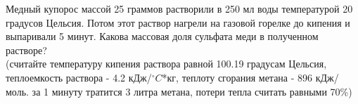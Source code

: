 Медный купорос массой 25 граммов растворили в 250 мл воды температурой 20 градусов Цельсия. Потом этот раствор нагрели на газовой горелке до кипения и выпаривали 5 минут. Какова массовая доля сульфата меди в полученном растворе?
\\
(считайте температуру кипения раствора равной 100.19 градусам Цельсия, теплоемкость раствора - 4.2 кДж/$^\circ C$*кг, теплоту сгорания метана - 896 кДж/моль. за 1 минуту тратится 3 литра метана, потери тепла считать равными 70\%)

